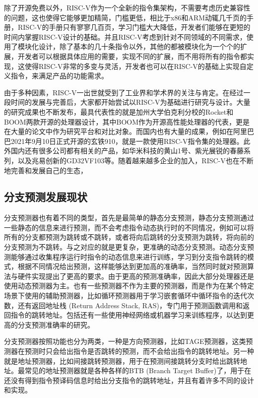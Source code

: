 除了开源免费以外，RISC-V作为一个全新的指令集架构，不需要考虑历史兼容性的问题，这也使得它能够更加精简，门槛更低，相比于x86和ARM动辄几千页的手册，RISC-V的手册只有寥寥几百页，学习门槛大大降低，开发者们能够在更短的时间内掌握RISC-V设计的基础。并且RISC-V考虑到针对不同领域的不同需求，使用了模块化设计，除了基本的几十条指令以外，其他的都被模块化为一个个的扩展，开发者可以根据具体应用的需要，实现不同的扩展，而不用将所有的指令都实现，这使得RISC-V非常的多变与灵活，开发者也可以在RISC-V的基础上实现自定义指令，来满足产品的功能需求。

由于多种因素，RISC-V一出世就受到了工业界和学术界的关注与肯定。在经过一段时间的发展与完善后，大家都开始尝试以RISC-V为基础进行研究与设计。大量的研究成果也不断发布，最具代表性的就是加州大学伯克利分校的Rocket\cite{rocket}和BOOM两款开源的处理器设计，其中BOOM作为开源高性能处理器的代表，更是在大量的论文中作为研究平台和对比对象。而国内也有大量的成果，例如在阿里巴巴2021年9月10日正式开源的玄铁910，就是一款使用RISC-V指令集的处理器。此外国内还有很多公司都有相关的产品，如华米科技的黄山1号、紫光展锐的春藤系列，以及兆易创新的GD32VF103等。随着越来越多企业的加入，RISC-V也在不断地完善和发展自己的生态，

\subsection{分支预测发展现状}

分支预测器也有着不同的类型，首先是最简单的静态分支预测，静态分支预测通过一些静态的信息来进行预测，而不会考虑指令动态执行时的不同情况，例如可以将所有的分支都预测为跳转或不跳转\cite{branch-98}，或者将向后跳转的分支预测为跳转，将向前的分支预测为不跳转。与之对应的就是更复杂，更准确的动态分支预测。动态分支预测能够通过收集程序运行时指令的动态信息来进行训练，学习到分支指令跳转的模式，根据不同情况给出预测，这样能够达到更加高的准确率，当然同时就对预测算法与硬件实现提出了更高的要求。由于更高的预测准确率，因此大部分处理器还是使用动态预测器为主。也有一些预测器不作为主要的预测器，而是作为在某个特定场景下使用的辅助预测器，比如循环预测器用于学习嵌套循环中循环指令的迭代次数，还有返回地址栈 (Return Address Stack, RAS)，专门用于预测函数调用和返回指令的跳转地址。包括还有一些使用神经网络或机器学习来训练程序，以达到更高的分支预测准确率的研究\cite{branch-neural,branch-not-resolved,fast-neural-branch}。

分支预测器按照功能也分为两类，一种是方向预测器，比如TAGE预测器，这类预测器在预测时只会给出指令是否跳转的预测，而不会给出指令的跳转地址。另一种就是地址预测器，比如间接跳转预测器，用于在预测间接跳转分支时给出跳转地址。最常见的地址预测器就是各种各样的BTB (Branch Target Buffer)了，用于在还没有得到指令预译码信息时给出分支指令的跳转地址，并且有着许多不同的设计和实现。

